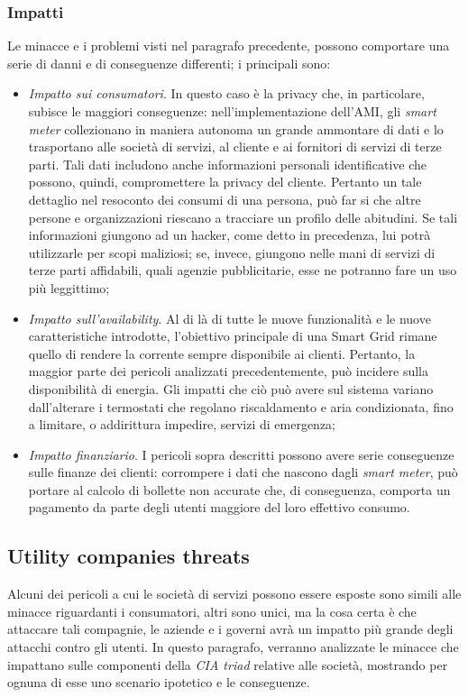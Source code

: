 \subsubsection{Impatti}
Le minacce e i problemi visti nel paragrafo precedente, possono comportare una serie di danni e di conseguenze differenti; i principali sono:
\begin{itemize}
\item \textit{Impatto sui consumatori}. In questo caso è la privacy che, in particolare, subisce le maggiori conseguenze: nell'implementazione dell'AMI, gli \textit{smart meter} collezionano in maniera autonoma un grande ammontare di dati e lo trasportano alle società di servizi, al cliente e ai fornitori di servizi di terze parti. Tali dati includono anche informazioni personali identificative che possono, quindi, compromettere la privacy del cliente. Pertanto un tale dettaglio nel resoconto dei consumi di una persona, può far si che altre persone e organizzazioni riescano a tracciare un profilo delle abitudini. Se tali informazioni giungono ad un hacker, come detto in precedenza, lui potrà utilizzarle per scopi maliziosi; se, invece, giungono nelle mani di servizi di terze parti affidabili, quali agenzie pubblicitarie, esse ne potranno fare un uso più leggittimo;
\item \textit{Impatto sull'availability}. Al di là di tutte le nuove funzionalità e le nuove caratteristiche introdotte, l'obiettivo principale di una Smart Grid rimane quello di rendere la corrente sempre disponibile ai clienti. Pertanto, la maggior parte dei pericoli analizzati precedentemente, può incidere sulla disponibilità di energia. Gli impatti che ciò può avere sul sistema variano dall'alterare i termostati che regolano riscaldamento e aria  condizionata, fino a limitare, o addirittura impedire, servizi di emergenza;
\item \textit{Impatto finanziario}. I pericoli sopra descritti possono avere serie conseguenze sulle finanze dei clienti: corrompere i dati che nascono dagli \textit{smart meter}, può portare al calcolo di bollette non accurate che, di conseguenza, comporta un pagamento da parte degli utenti maggiore del loro effettivo consumo.
\end{itemize}

\subsection{Utility companies threats}
Alcuni dei pericoli a cui le società di servizi possono essere esposte sono simili alle minacce riguardanti i consumatori, altri sono unici, ma la cosa certa è che attaccare tali compagnie, le aziende e i governi avrà un impatto più grande degli attacchi contro gli utenti. \newline In questo paragrafo, verranno analizzate le minacce che impattano sulle componenti della \textit{CIA triad} relative alle società, mostrando per ognuna di esse uno scenario ipotetico e le conseguenze.

